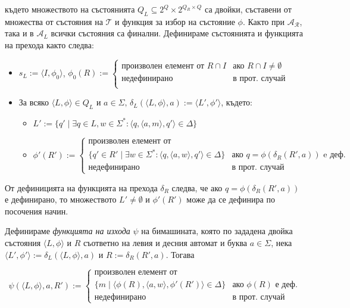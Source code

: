 \documentclass[12pt, oneside]{article}
\theoremstyle{definition}
\begin{document}
където множеството на състоянията \( Q_L \subseteq 2^Q \times 2^{Q_R \times Q} \) са двойки, съставени от множества от състояния на \(\mathcal{T}\) и функция за избор на състояние \(\phi\). Както при \(\mathcal{A_R}\), така и в \(\mathcal{A}_L\) всички състояния са финални. Дефинираме състоянията и функцията на прехода както следва:

\begin{itemize}
	\item \( s_L := \langle I, \phi_0 \rangle \), \( \phi_0(R) :=  
	\begin{cases} 
		\text{произволен елемент от } R \cap I & \text{ако } R \cap I \neq \emptyset \\
		\text{недефинирано} & \text{в прот. случай} \\
	\end{cases} \)
	\item За всяко \( \langle L, \phi \rangle \in Q_L \text{ и } a \in \Sigma \text{, } \delta_L(\langle L, \phi \rangle, a) := \langle L', \phi' \rangle \), където:
	\begin{itemize}
		\item \( L' := \{ q' \mid \exists q \in L, w \in \Sigma^* : \langle q, \langle a, m \rangle, q' \rangle \in \Delta \} \)
		\item \( \phi'(R') := 
		\begin{cases}
			\text{произволен елемент от } \\
			\{ q' \in R' \mid \exists w \in \Sigma^* : \langle q, \langle a, w \rangle, q' \rangle \in \Delta \} & \text{ако } q = \phi(\delta_R(R', a)) \text{ e деф.} \\
			\text{недефинирано} & \text{в прот. случай}
		\end{cases} \)
	\end{itemize}
\end{itemize}

От дефиницията на функцията на прехода \( \delta_R \) следва, че ако \( q = \phi(\delta_R(R', a)) \) е дефинирано, то множеството \( L' \neq \emptyset \) и \( \phi'(R') \) може да се дефинира по посочения начин.

Дефинираме \emph{функцията на изхода} \(\psi\) на бимашината, която по зададена двойка състояния \(\langle L, \phi \rangle\) и \(R\) съответно на левия и десния автомат и буква \( a \in \Sigma \), нека \( \langle L', \phi' \rangle := \delta_L(\langle L, \phi \rangle, a) \) и \( R := \delta_R(R', a) \). Тогава

\[
	\psi(\langle L, \phi \rangle, a, R') := 
	\begin{cases}
		\text{произволен елемент от} \\
		\{ m \mid \langle \phi(R), \langle a, w \rangle, \phi'(R') \rangle \in \Delta \} & \text{ако } \phi(R) \text{ е деф.} \\
		\text{недефинирано} & \text{в прот. случай}
	\end{cases}
\]
\end{document}

